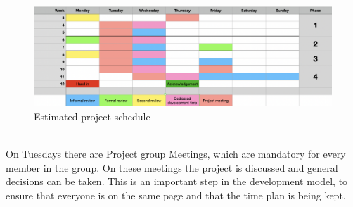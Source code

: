 \documentclass{article}
\begin{document}
    \begin{figure}[h]
        \centering
        \includegraphics[width=\textwidth]{images/schedule.png}
        \caption{Estimated project schedule}
        \label{schedule}
    \end{figure}
    \noindent
    \\
    On Tuesdays there are Project group Meetings\label{PM}, which are mandatory for every member in the group.
    On these meetings the project is discussed and general decisions can be taken. This is an important step in the development model, to ensure that everyone is on the same page and that the time plan is being kept.
    
\end{document}
